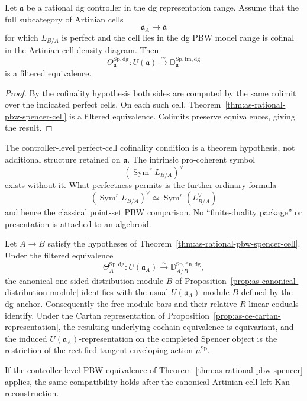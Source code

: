 \begin{theorem}
\label{thm:as-rational-pbw-spencer}
Let $\mathfrak a$ be a rational dg controller in the dg representation range.
Assume that the full subcategory of Artinian cells
\[
    \mathfrak a_A\longrightarrow\mathfrak a
\]
for which $L_{B/A}$ is perfect and the cell lies in the dg PBW model range is
cofinal in the Artinian-cell density diagram.  Then
\[
\boxed{
    \Theta_{\mathfrak a}^{\mathrm{Sp,dg}}:
    U(\mathfrak a)
    \xrightarrow{\sim}
    \mathbb D_{\mathfrak a}^{\mathrm{Sp,fin,dg}}
}
\]
is a filtered equivalence.
\end{theorem}

\begin{proof}
By the cofinality hypothesis both sides are computed by the same colimit over
the indicated perfect cells.  On each such cell,
Theorem~\ref{thm:as-rational-pbw-spencer-cell} is a filtered equivalence.
Colimits preserve equivalences, giving the result.
\end{proof}

\begin{remark}
The controller-level perfect-cell cofinality condition is a theorem
hypothesis, not additional structure retained on $\mathfrak a$.  The
intrinsic pro-coherent symbol
\[
    \left(
        \operatorname{Sym}^r L_{B/A}
    \right)^\vee
\]
exists without it.  What perfectness permits is the further ordinary formula
\[
    \left(
        \operatorname{Sym}^r L_{B/A}
    \right)^\vee
    \simeq
    \operatorname{Sym}^r
    \left(
        L_{B/A}^\vee
    \right)
\]
and hence the classical point-set PBW comparison.  No ``finite-duality
package'' or presentation is attached to an algebroid.
\end{remark}

\begin{proposition}
\label{prop:as-pbw-action-compatibility}
Let $A\to B$ satisfy the hypotheses of
Theorem~\ref{thm:as-rational-pbw-spencer-cell}.  Under the filtered
equivalence
\[
    \Theta_A^{\mathrm{Sp,dg}}:
    U(\mathfrak a_A)
    \xrightarrow{\sim}
    \mathbb D_{A/B}^{\mathrm{Sp,fin,dg}},
\]
the canonical one-sided distribution module $B$ of
Proposition~\ref{prop:as-canonical-distribution-module} identifies with the
usual $U(\mathfrak a_A)$-module $B$ defined by the dg anchor.  Consequently
the free module bars and their relative $R$-linear coduals identify.  Under
the Cartan representation of
Proposition~\ref{prop:as-ce-cartan-representation}, the resulting underlying
cochain equivalence is equivariant, and the induced
$U(\mathfrak a_A)$-representation on the completed Spencer object is the
restriction of the rectified tangent-enveloping action
$\mu^{\mathrm{Sp}}$.

If the controller-level PBW equivalence of
Theorem~\ref{thm:as-rational-pbw-spencer} applies, the same compatibility
holds after the canonical Artinian-cell left Kan reconstruction.
\end{proposition}

